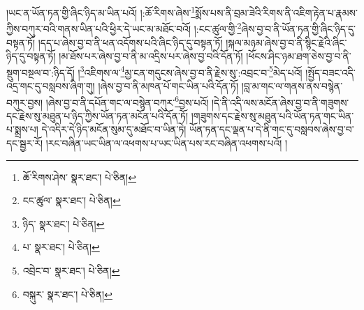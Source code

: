 །ཡང་ན་ཡོན་ཏན་གྱི་ཞིང་ཉིད་མ་ཡིན་པའོ། །:ཆོ་རིགས་ཞེས་\footnote{ཆོ་རིགས་ཤེས་  སྣར་ཐང་།  པེ་ཅིན། }སྨོས་པས་ནི་བྲམ་ཟེའི་རིགས་ནི་འཇིག་རྟེན་པ་རྣམས་ཀྱིས་བཀུར་བའི་གནས་ཡིན་པའི་ཕྱིར་དེ་ཡང་མ་མཐོང་བའོ། །:ངང་ཚུལ་གྱི་\footnote{ངང་ཚུལ་  སྣར་ཐང་།  པེ་ཅིན། }ཞེས་བྱ་བ་ནི་ཡོན་ཏན་གྱི་ཞིང་ཉིད་དུ་བསྟན་ཏོ། །དད་པ་ཞེས་བྱ་བ་ནི་ཕན་འདོགས་པའི་ཞིང་ཉིད་དུ་བསྟན་ཏོ། །སྐལ་མཉམ་ཞེས་བྱ་བ་ནི་སྙིང་རྗེའི་ཞིང་ཉིད་དུ་བསྟན་ཏོ། །མ་ཐོས་པར་ཞེས་བྱ་བ་ནི་མ་འདྲིས་པར་ཞེས་བྱ་བའི་དོན་ཏོ། །ཕོངས་ཤིང་ཉམ་ཐག་ཅེས་བྱ་བ་ནི་སྡུག་བསྔལ་བ་:ཉིད་དོ། །\footnote{ཉིད་  སྣར་ཐང་།  པེ་ཅིན། }འཇིགས་ལ་\footnote{པ་  སྣར་ཐང་།  པེ་ཅིན། }མྱ་ངན་གདུངས་ཞེས་བྱ་བ་ནི་རྗེས་སུ་:འབྲང་བ་\footnote{འབྲེང་བ་  སྣར་ཐང་།  པེ་ཅིན། }མེད་པའོ། །སྤྱོད་བཟང་འདི་འདྲ་གང་དུ་བསླབས་ཞིག་གུ། །ཞེས་བྱ་བ་ནི་མཁན་པོ་གང་ཡིན་པའི་དོན་ཏོ། །བླ་མ་གང་ལ་གནས་ནས་བསྙེན་བཀུར་བྱས། །ཞེས་བྱ་བ་ནི་དཔོན་གང་ལ་བསྙེན་བཀུར་\footnote{བསྐུར་  སྣར་ཐང་།  པེ་ཅིན། }བྱས་པའོ། །དེ་ནི་འདི་ལས་མངོན་ཞེས་བྱ་བ་ནི་གཟུགས་དང་རྗེས་སུ་མཐུན་པ་ཉིད་ཀྱིས་ཡོན་ཏན་མངོན་པའི་དོན་ཏོ། །གཟུགས་དང་རྗེས་སུ་མཐུན་པའི་ཡོན་ཏན་གང་ཡིན་པ་སྨྲས་པ། དེ་འདིར་དེ་ཉིད་མངོན་སུམ་དུ་མཐོང་བ་ཡིན་ཏེ། ཡོན་ཏན་དང་ལྡན་པ་དེ་ནི་གང་དུ་བསླབས་ཞེས་བྱ་བ་དང་སྦྱར་རོ། །རང་བཞིན་ཡང་ཡིན་ལ་འཕགས་པ་ཡང་ཡིན་པས་རང་བཞིན་འཕགས་པའོ། །
